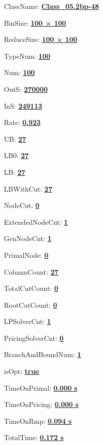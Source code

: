 \documentclass[11pt]{article}
\begin{document}
\pagestyle{empty}


ClassName: \underline{\textbf{Class_05.2bp-48}}
\par
BinSize: \underline{\textbf{100 × 100}}
\par
ReduceSize: \underline{\textbf{100 × 100}}
\par
TypeNum: \underline{\textbf{100}}
\par
Num: \underline{\textbf{100}}
\par
OutS: \underline{\textbf{270000}}
\par
InS: \underline{\textbf{249113}}
\par
Rate: \underline{\textbf{0.923}}
\par
UB: \underline{\textbf{27}}
\par
LB0: \underline{\textbf{27}}
\par
LB: \underline{\textbf{27}}
\par
LBWithCut: \underline{\textbf{27}}
\par
NodeCut: \underline{\textbf{0}}
\par
ExtendedNodeCnt: \underline{\textbf{1}}
\par
GenNodeCnt: \underline{\textbf{1}}
\par
PrimalNode: \underline{\textbf{0}}
\par
ColumnCount: \underline{\textbf{27}}
\par
TotalCutCount: \underline{\textbf{0}}
\par
RootCutCount: \underline{\textbf{0}}
\par
LPSolverCnt: \underline{\textbf{1}}
\par
PricingSolverCnt: \underline{\textbf{0}}
\par
BranchAndBoundNum: \underline{\textbf{1}}
\par
isOpt: \underline{\textbf{true}}
\par
TimeOnPrimal: \underline{\textbf{0.000 s}}
\par
TimeOnPricing: \underline{\textbf{0.000 s}}
\par
TimeOnRmp: \underline{\textbf{0.094 s}}
\par
TotalTime: \underline{\textbf{0.172 s}}
\par
\newpage


\end{document}
